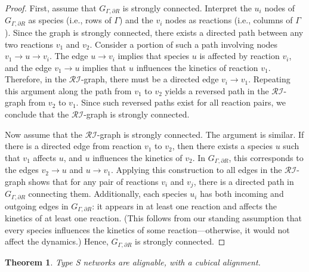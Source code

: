 \documentclass{article}
\newtheorem{thm}{Theorem}
\begin{document}
\begin{proof}
First, assume that \( G_{\Gamma, \partial R} \) is strongly connected. Interpret the \( u_i \) nodes of \( G_{\Gamma, \partial R} \) as species (i.e., rows of \( \Gamma \)) and the \( v_i \) nodes as reactions (i.e., columns of \( \Gamma \)). Since the graph is strongly connected, there exists a directed path between any two reactions \( v_1 \) and \( v_2 \). Consider a portion of such a path involving nodes \( v_1 \to u \to v_i \). The edge \( u \to v_i \) implies that species \( u \) is affected by reaction \( v_i \), and the edge \( v_1 \to u \) implies that \( u \) influences the kinetics of reaction \( v_1 \). Therefore, in the \( \mathcal{RI} \)-graph, there must be a directed edge \( v_i \to v_1 \). Repeating this argument along the path from \( v_1 \) to \( v_2 \) yields a reversed path in the \( \mathcal{RI} \)-graph from \( v_2 \) to \( v_1 \). Since such reversed paths exist for all reaction pairs, we conclude that the \( \mathcal{RI} \)-graph is strongly connected.

Now assume that the \( \mathcal{RI} \)-graph is strongly connected. The argument is similar. If there is a directed edge from reaction \( v_1 \) to \( v_2 \), then there exists a species \( u \) such that \( v_1 \) affects \( u \), and \( u \) influences the kinetics of \( v_2 \). In \( G_{\Gamma, \partial R} \), this corresponds to the edges \( v_2 \to u \) and \( u \to v_1 \). Applying this construction to all edges in the \( \mathcal{RI} \)-graph shows that for any pair of reactions \( v_i \) and \( v_j \), there is a directed path in \( G_{\Gamma, \partial R} \) connecting them. Additionally, each species \( u_i \) has both incoming and outgoing edges in \( G_{\Gamma, \partial R} \): it appears in at least one reaction and affects the kinetics of at least one reaction. (This follows from our standing assumption that every species influences the kinetics of some reaction—otherwise, it would not affect the dynamics.) Hence, \( G_{\Gamma, \partial R} \) is strongly connected.
\end{proof}


\begin{thm}
\label{thm:type S align}
    Type S networks are alignable, with a cubical alignment.
\end{thm}
    
\end{document}
